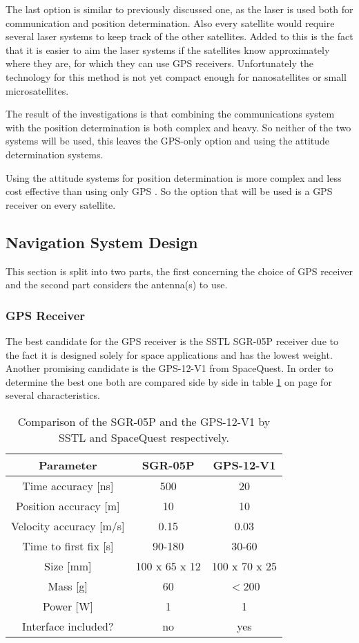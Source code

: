 The last option is similar to previously discussed one, as the laser is used both for communication and position determination. Also every satellite would require several laser systems to keep track of the other satellites. Added to this is the fact that it is easier to aim the laser systems if the satellites know approximately where they are, for which they can use \acs{GPS} receivers. Unfortunately the technology for this method is not yet compact enough for nanosatellites or small microsatellites.

The result of the investigations is that combining the communications system with the position determination is both complex and heavy. So neither of the two systems will be used, this leaves the \acs{GPS}-only option and using the attitude determination systems.

Using the attitude systems for position determination is more complex and less cost effective than using only \acs{GPS} \cite{MicroGPS}. So the option that will be used is a \acs{GPS} receiver on every satellite.

\subsection{Navigation System Design}
\label{navi3}
This section is split into two parts, the first concerning the choice of \acs{GPS} receiver and the second part considers the antenna(s) to use.

\subsubsection{GPS Receiver}
The best candidate for the GPS receiver is the \acs{SSTL} SGR-05P receiver due to the fact it is designed solely for space applications and has the lowest weight. Another promising candidate is the GPS-12-V1 from SpaceQuest. In order to determine the best one both are compared side by side in table \ref{comparegps} on page \pageref{comparegps} for several characteristics.

\begin{table}
\centering
\begin{tabular}{c||c|c}
\textbf{Parameter} & \textbf{SGR-05P} & \textbf{GPS-12-V1} \\\hline\hline
	Time accuracy [ns] & 500 & 20 \\
	Position accuracy [m] & 10 & 10 \\
	Velocity accuracy [m/s] & 0.15 & 0.03 \\
	Time to first fix [s] & 90-180 & 30-60 \\
	Size [mm] & 100 x 65 x 12 & 100 x 70 x 25\\
	Mass [g] & 60 & $<$200 \\
	Power [W] & 1 & 1 \\
	Interface included? & no & yes \\
\end{tabular}
\caption{Comparison of the SGR-05P and the GPS-12-V1 by \acs{SSTL} and SpaceQuest respectively.}
\label{comparegps}
\end{table}


